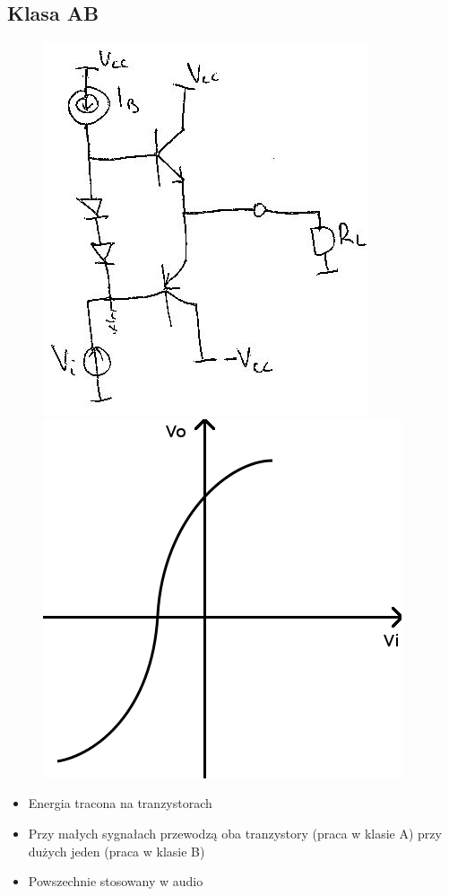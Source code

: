 \documentclass[10pt,a4paper]{article}
\begin{document}
\subsection{Klasa AB}
\begin{figure}[H]
\centering
\includegraphics[scale=1]{wzm_moc_ab}
\includegraphics[scale=0.5]{wzm_moc_ab_wyk}
\end{figure}
\begin{itemize}
\item{Energia tracona na tranzystorach}
\item{Przy małych sygnałach przewodzą oba tranzystory (praca w klasie A) przy dużych jeden (praca w klasie B)}
\item{Powszechnie stosowany w audio}
\end{itemize}
\end{document}
